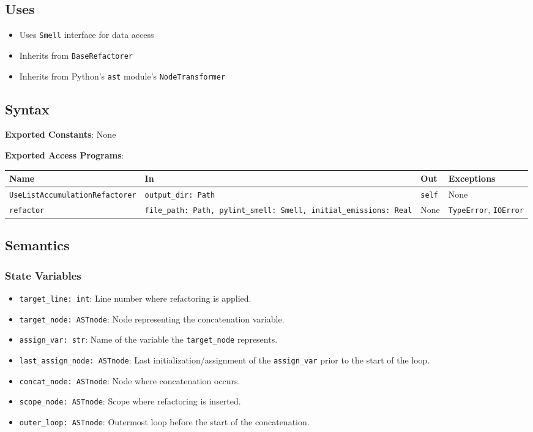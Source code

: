 \documentclass[12pt, titlepage]{article}
\begin{document}
\subsection{Uses}
\begin{itemize}
  \item Uses \texttt{Smell} interface for data access
  \item Inherits from \texttt{BaseRefactorer}
  \item Inherits from Python's \texttt{ast} module's \texttt{NodeTransformer}
\end{itemize}
  
\subsection{Syntax}
\noindent
\textbf{Exported Constants}: None

\noindent
\textbf{Exported Access Programs}:
  
\begin{tabularx}{\linewidth}{|
    l|
    >{\raggedright\arraybackslash}X|
    l|
    l|}
  \hline
  \textbf{Name} & \textbf{In} & \textbf{Out} & \textbf{Exceptions} \\
  \hline
  \texttt{UseListAccumulationRefactorer} & \texttt{output\_dir: Path} & \texttt{self} & None \\
  \hline
  \texttt{refactor} & \texttt{file\_path: Path, pylint\_smell: Smell, initial\_emissions: Real} & None & \texttt{TypeError}, \texttt{IOError} \\
  \hline
\end{tabularx}
  
\subsection{Semantics}
  
\subsubsection{State Variables}
\begin{itemize}
  \item \texttt{target\_line: int}: Line number where refactoring is applied.
  \item \texttt{target\_node: ASTnode}: Node representing the concatenation variable.
  \item \texttt{assign\_var: str}: Name of the variable the \texttt{target\_node} represents.
  \item \texttt{last\_assign\_node: ASTnode}: Last initialization/assignment of the \texttt{assign\_var} prior to the start of the loop.
  \item \texttt{concat\_node: ASTnode}: Node where concatenation occurs.
  \item \texttt{scope\_node: ASTnode}: Scope where refactoring is inserted.
  \item \texttt{outer\_loop: ASTnode}: Outermost loop before the start of the concatenation.
\end{itemize}
  
\end{document}
